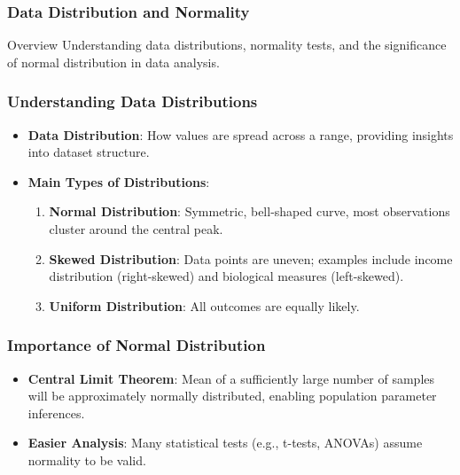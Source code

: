 \documentclass[aspectratio=169]{beamer}
\begin{document}
\begin{frame}[fragile]
    \frametitle{Data Distribution and Normality}
    \begin{block}{Overview}
        Understanding data distributions, normality tests, and the significance of normal distribution in data analysis.
    \end{block}
\end{frame}

\begin{frame}[fragile]
    \frametitle{Understanding Data Distributions}
    \begin{itemize}
        \item \textbf{Data Distribution}: How values are spread across a range, providing insights into dataset structure.
        \item \textbf{Main Types of Distributions}:
            \begin{enumerate}
                \item \textbf{Normal Distribution}: Symmetric, bell-shaped curve, most observations cluster around the central peak.
                \item \textbf{Skewed Distribution}: Data points are uneven; examples include income distribution (right-skewed) and biological measures (left-skewed).
                \item \textbf{Uniform Distribution}: All outcomes are equally likely.
            \end{enumerate}
    \end{itemize}
\end{frame}

\begin{frame}[fragile]
    \frametitle{Importance of Normal Distribution}
    \begin{itemize}
        \item \textbf{Central Limit Theorem}: Mean of a sufficiently large number of samples will be approximately normally distributed, enabling population parameter inferences.
        \item \textbf{Easier Analysis}: Many statistical tests (e.g., t-tests, ANOVAs) assume normality to be valid.
    \end{itemize}
\end{frame}
\end{document}
